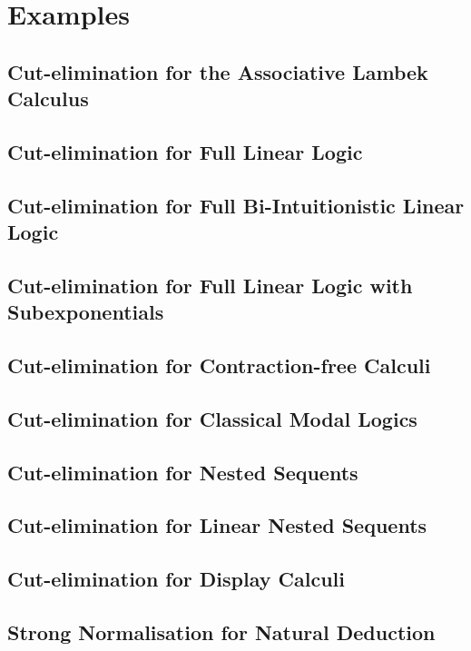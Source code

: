 \documentclass[a4paper]{article}
\begin{document}
\section{Examples}

\subsection{Cut-elimination for the Associative Lambek Calculus}

\subsection{Cut-elimination for Full Linear Logic}

\subsection{Cut-elimination for Full Bi-Intuitionistic Linear Logic}

\subsection{Cut-elimination for Full Linear Logic with Subexponentials}

\subsection{Cut-elimination for Contraction-free Calculi}

\subsection{Cut-elimination for Classical Modal Logics}

\subsection{Cut-elimination for Nested Sequents}

\subsection{Cut-elimination for Linear Nested Sequents}

\subsection{Cut-elimination for Display Calculi}

\subsection{Strong Normalisation for Natural Deduction}
\end{document}
